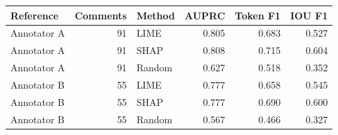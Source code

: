 \begin{tabular}{lrlrrr}
\toprule
Reference & Comments & Method & AUPRC & Token F1 & IOU F1 \\
\midrule
Annotator A & 91 & LIME & 0.805 & 0.683 & 0.527 \\
Annotator A & 91 & SHAP & 0.808 & 0.715 & 0.604 \\
Annotator A & 91 & Random & 0.627 & 0.518 & 0.352 \\
Annotator B & 55 & LIME & 0.777 & 0.658 & 0.545 \\
Annotator B & 55 & SHAP & 0.777 & 0.690 & 0.600 \\
Annotator B & 55 & Random & 0.567 & 0.466 & 0.327 \\
\bottomrule
\end{tabular}
